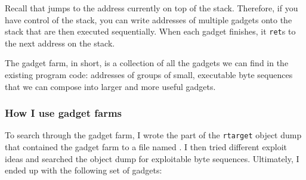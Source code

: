 Recall that  jumps to the address currently on top of the stack.
Therefore, if you have control of the stack, you can write addresses of multiple gadgets onto the stack that are then executed sequentially. When each gadget finishes, it \texttt{ret}s to the next address on the stack.

The gadget farm, in short, is a collection of all the gadgets we can find in the existing program code: addresses of groups of small, executable byte sequences that we can compose into larger and more useful gadgets.

\subsubsection{How I use gadget farms}

To search through the gadget farm, I wrote the part of the \texttt{rtarget} object dump that contained the gadget farm to a file named . I then tried different exploit ideas and searched the object dump for exploitable byte sequences. Ultimately, I ended up with the following set of gadgets:

